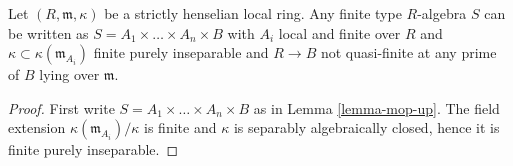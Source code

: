 \begin{lemma}
\label{lemma-mop-up-strictly-henselian}
Let $(R, \mathfrak m, \kappa)$ be a strictly henselian local ring.
Any finite type $R$-algebra $S$ can be written as
$S = A_1 \times \ldots \times A_n \times B$ with $A_i$ local
and finite over $R$ and $\kappa \subset \kappa(\mathfrak m_{A_i})$
finite purely inseparable and $R \to B$ not quasi-finite
at any prime of $B$ lying over $\mathfrak m$.
\end{lemma}

\begin{proof}
First write $S = A_1 \times \ldots \times A_n \times B$ as in
Lemma \ref{lemma-mop-up}.
The field extension $\kappa(\mathfrak m_{A_i})/\kappa$
is finite and $\kappa$ is separably algebraically closed, hence
it is finite purely inseparable.
\end{proof}
